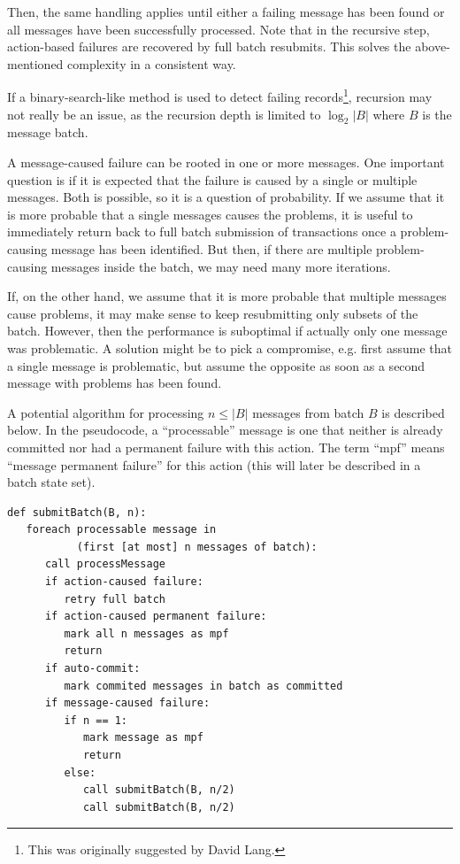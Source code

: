 \documentclass[a4paper,10pt]{article}
\begin{document}
Then, the same handling applies until either a failing message has been found or all messages have been successfully processed. Note that in the recursive step, action-based failures are recovered by full batch resubmits. This solves the above-mentioned complexity in a consistent way.

If a binary-search-like method is used to detect failing records\footnote{This was originally suggested by David Lang.}, recursion may not really be an issue, as the recursion depth is limited to $\log_2 |B|$ where $B$ is the message batch.

A message-caused failure can be rooted in one or more messages. One important question is if it is expected that the failure is caused by a single or multiple messages. Both is possible, so it is a question of probability. If we assume that it is more probable that a single messages causes the problems, it is useful to immediately return back to full batch submission of transactions once a problem-causing message has been identified. But then, if there are multiple problem-causing messages inside the batch, we may need many more iterations.

If, on the other hand, we assume that it is more probable that multiple messages cause problems, it may make sense to keep resubmitting only subsets of the batch. However, then the performance is suboptimal if actually only one message was problematic. A solution might be to pick a compromise, e.g. first assume that a single message is problematic, but assume the opposite as soon as a second message with problems has been found.

A potential algorithm for processing $n \le |B|$ messages from batch $B$ is described below. In the pseudocode, a ``processable'' message is one that neither is already committed nor had a permanent failure with this action. The term ``mpf'' means ``message permanent failure'' for this action (this will later be described in a batch state set).

\begin{small}
\lstset{language=python}
\begin{lstlisting}
def submitBatch(B, n):
   foreach processable message in 
           (first [at most] n messages of batch):
      call processMessage
      if action-caused failure:
         retry full batch
      if action-caused permanent failure:
         mark all n messages as mpf
         return
      if auto-commit:
         mark commited messages in batch as committed
      if message-caused failure:
         if n == 1:
            mark message as mpf
            return
         else:
            call submitBatch(B, n/2)
            call submitBatch(B, n/2)
\end{lstlisting}
\end{small}
\end{document}
